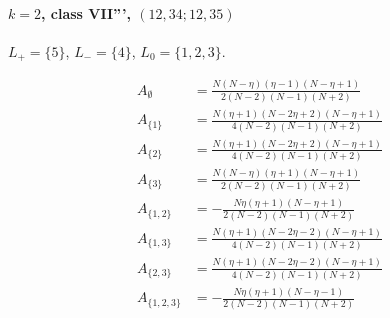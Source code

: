 \documentclass[11pt]{article}
\begin{document}
\paragraph{$k=2$, class VII''', $(12,34;12,35)$}

$L_+=\{5\}$, $L_-=\{4\}$, $L_0=\{1,2,3\}$.

\begin{align*}
  A_{\emptyset} &= \frac{N \left(N - \eta\right) \left(\eta - 1\right) \left(N - \eta + 1\right)}{2 \left(N - 2\right) \left(N - 1\right) \left(N + 2\right)} \\
  A_{\{1\}} &= \frac{N \left(\eta + 1\right) \left(N - 2 \eta + 2\right) \left(N - \eta + 1\right)}{4 \left(N - 2\right) \left(N - 1\right) \left(N + 2\right)} \\
  A_{\{2\}} &= \frac{N \left(\eta + 1\right) \left(N - 2 \eta + 2\right) \left(N - \eta + 1\right)}{4 \left(N - 2\right) \left(N - 1\right) \left(N + 2\right)} \\
  A_{\{3\}} &= \frac{N \left(N - \eta\right) \left(\eta + 1\right) \left(N - \eta + 1\right)}{2 \left(N - 2\right) \left(N - 1\right) \left(N + 2\right)} \\
  A_{\{1,2\}} &= - \frac{N \eta \left(\eta + 1\right) \left(N - \eta + 1\right)}{2 \left(N - 2\right) \left(N - 1\right) \left(N + 2\right)} \\
  A_{\{1,3\}} &= \frac{N \left(\eta + 1\right) \left(N - 2 \eta - 2\right) \left(N - \eta + 1\right)}{4 \left(N - 2\right) \left(N - 1\right) \left(N + 2\right)} \\
  A_{\{2,3\}} &= \frac{N \left(\eta + 1\right) \left(N - 2 \eta - 2\right) \left(N - \eta + 1\right)}{4 \left(N - 2\right) \left(N - 1\right) \left(N + 2\right)} \\
  A_{\{1,2,3\}} &= - \frac{N \eta \left(\eta + 1\right) \left(N - \eta - 1\right)}{2 \left(N - 2\right) \left(N - 1\right) \left(N + 2\right)} 
\end{align*}
\end{document}
